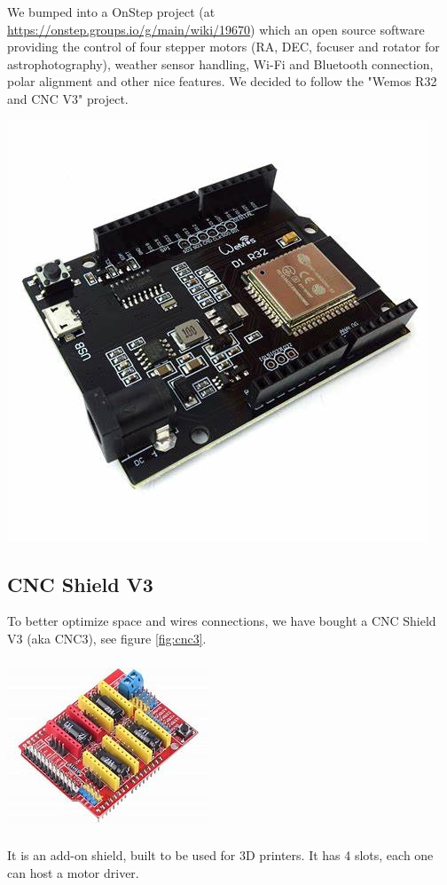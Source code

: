 \documentclass{article}
\begin{document}
\begin{multicols}{2}
        We bumped into a OnStep project (at \url{https://onstep.groups.io/g/main/wiki/19670}) which an open source software providing the control of four stepper motors (RA, DEC, focuser and rotator for astrophotography), weather sensor handling, Wi-Fi and Bluetooth connection, polar alignment and other nice features.
        We decided to follow the "Wemos R32 and CNC V3" project.
        
        \begin{minipage}
            {.4\textwidth}
            \includegraphics[scale=0.28]{esp32_d1_r32.jpg}
            \label{fig:esp32}
        \end{minipage}

        \subsection{CNC Shield V3}
        To better optimize space and wires connections, we have bought a CNC Shield V3 (aka CNC3), see figure \ref{fig:cnc3}.
        \begin{minipage}
            {0.5\textwidth}
            \centering
            \includegraphics[scale=0.5]{CNC3.jpg}
            \label{fig:cnc3}
        \end{minipage}
        It is an add-on shield, built to be used for 3D printers.
        It has 4 slots, each one can host a motor driver.


\end{multicols}
\end{document}
